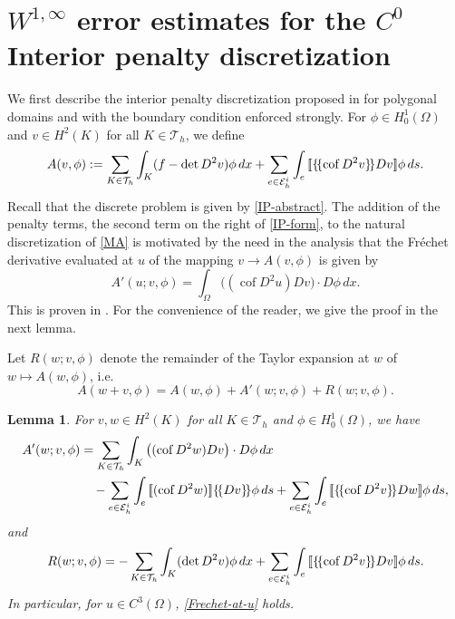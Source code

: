 \documentclass[12pt]{amsart}
\def \[{ \mbox{[ \hspace{-.5em}[}} %
\def \]{ \mbox{] \hspace{-.5em}]}}
\numberwithin{equation}{section}
\newcommand{\ud}{\,d}
\newcommand\cof{\operatorname{cof}}
\newtheorem{lemma}[thm]{Lemma}
\begin{document}
\section{$W^{1,\infty}$ error estimates for the $C^0$ Interior penalty discretization} \label{the-method}

We first describe the interior penalty discretization proposed in \cite{Brenner2010b} for polygonal domains and with the boundary condition enforced strongly. For $\phi \in H_0^1(\Omega)$ and $v \in H^2(K)$ for all $K \in \mathcal{T}_h$,
we define
\begin{equation}\label{IP-form}
A(v,\phi) := \sum_{K \in \mathcal{T}_h} \int_{K} (f-\det D^2 v) \phi \ud x + \sum_{e \in \mathcal{E}_h^i } \int_e \[\{\!\{\cof D^2 v \}\!\} D v \] \phi
\ud s.
\end{equation}
Recall that the discrete problem is given by \eqref{IP-abstract}. The addition of the penalty terms, the second term on the right of \eqref{IP-form}, to the natural discretization of \eqref{MA} is motivated by the need in the analysis that the Fr\'echet derivative evaluated at $u$ of the mapping $v \to A(v,\phi)$ is given by
\begin{equation}\label{Frechet-at-u}
A'(u;v,\phi)= \int_{\Omega} \big( (\cof  D^2 u) D v \big) \cdot D \phi \ud x.
\end{equation} 
This is proven in \cite[p. 5]{Brenner2010b}. For the convenience of the reader, we give the proof %
in the next lemma.

Let $R(w;v,\phi)$ denote the remainder of the Taylor expansion at $w$ of $w \mapsto A(w,\phi)$, i.e. 
\begin{equation} \label{rdef0}
A(w+v,\phi)=A(w,\phi)+A'(w;v,\phi) + R(w;v,\phi).
\end{equation}

\begin{lemma}\label{interior-penalty-frechet-lemma}
For $v, w \in H^2(K)$ for all $K \in \mathcal{T}_h$ and $\phi \in H^1_0(\Omega)$, we have
\begin{align}\label{IP-frechet}
\begin{split}
A'(w;v,\phi) &  = \sum_{K \in \mathcal{T}_h} \int_{K }\big( (\cof  D^2 w)  D v \big) \cdot D \phi \ud x \\
& \quad - \sum_{e \in \mathcal{E}_h^i }
\int_e \[(\cof  D^2 w)\] \{\!\{D v\}\!\} \phi  \ud s 
 + \sum_{e \in \mathcal{E}_h^i } \int_e \[\{\!\{\cof D^2 v \}\!\} D w \] \phi
\ud s,
\end{split}
\end{align}
and
\begin{align} \label{rdef1}
R(w;v,\phi) = -\sum_{K \in \mathcal{T}_h}  \int_{K} (\det D^2v)\phi\ud x + \sum_{e \in \mathcal{E}_h^i } \int_e \[\{\!\{\cof D^2 v \}\!\} D v \] \phi\ud s.
\end{align}
In particular, for $u \in C^3(\Omega)$, \eqref{Frechet-at-u} holds.

\end{lemma}
\end{document}
